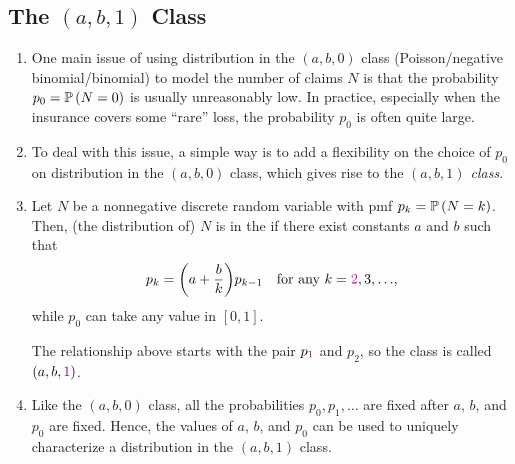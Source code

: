 \subsection{The \((a,b,1)\) Class}
\begin{enumerate}
\item One main issue of using distribution in the \((a,b,0)\) class
(Poisson/negative binomial/binomial) to model the number of claims \(N\) is
that the probability \(p_0=\mathbb{P}\left(N=0\right)\) is usually unreasonably low. In practice,
especially when the insurance covers some ``rare'' loss, the probability
\(p_0\) is often quite large.

\item To deal with this issue, a simple way is to add a flexibility on the
choice of \(p_0\) on distribution in the \((a,b,0)\) class, which gives rise to
the \emph{\((a,b,1)\) class}.

\item Let \(N\) be a nonnegative discrete random variable with pmf
\(p_k=\mathbb{P}\left(N=k\right)\). Then, (the distribution of) \(N\) is in the  if there exist constants \(a\) and \(b\) such that
\[
p_k=\qty(a+\frac{b}{k})p_{k-1}\quad\text{for any \(k={\color{magenta}2},3,\dotsc\)},
\]
while \(p_0\) can take any value in \([0,1]\).

\begin{note}
The relationship above starts with the pair \(p_{\color{violet} 1}\) and
\(p_2\), so the class is called \((a,b,{\color{violet}1})\).
\end{note}

\item Like the \((a,b,0)\) class, all the probabilities \(p_0,p_1,\dotsc\) are
fixed after \(a\), \(b\), and \(p_0\) are fixed. Hence, the values of \(a\),
\(b\), and \(p_0\) can be used to uniquely characterize a distribution in the
\((a,b,1)\) class.
\end{enumerate}

